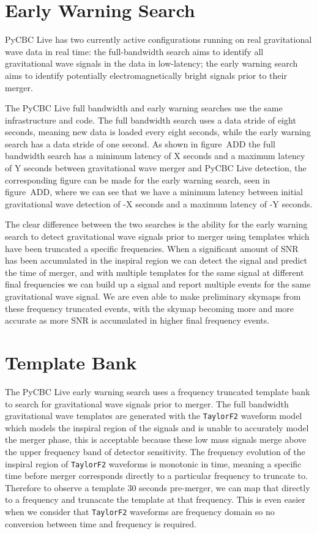 \section{Early Warning Search}

PyCBC Live has two currently active configurations running on real gravitational wave data in real time: the full-bandwidth search aims to identify all gravitational wave signals in the data in low-latency; the early warning search aims to identify potentially electromagnetically bright signals prior to their merger.

The PyCBC Live full bandwidth and early warning searches use the same infrastructure and code. The full bandwidth search uses a data stride of eight seconds, meaning new data is loaded every eight seconds, while the early warning search has a data stride of one second. As shown in figure~ADD the full bandwidth search has a minimum latency of X seconds and a maximum latency of Y seconds between gravitational wave merger and PyCBC Live detection, the corresponding figure can be made for the early warning search, seen in figure~ADD, where we can see that we have a minimum latency between initial gravitational wave detection of -X seconds and a maximum latency of -Y seconds.

The clear difference between the two searches is the ability for the early warning search to detect gravitational wave signals prior to merger using templates which have been truncated a specific frequencies. When a significant amount of SNR has been accumulated in the inspiral region we can detect the signal and predict the time of merger, and with multiple templates for the same signal at different final frequencies we can build up a signal and report multiple events for the same gravitational wave signal. We are even able to make preliminary skymaps from these frequency truncated events, with the skymap becoming more and more accurate as more SNR is accumulated in higher final frequency events.

\section{Template Bank}

The PyCBC Live early warning search uses a frequency truncated template bank to search for gravitational wave signals prior to merger. The full bandwidth gravitational wave templates are generated with the \verb|TaylorF2| waveform model which models the inspiral region of the signals and is unable to accurately model the merger phase, this is acceptable because these low mass signals merge above the upper frequency band of detector sensitivity. The frequency evolution of the inspiral region of \verb|TaylorF2| waveforms is monotonic in time, meaning a specific time before merger corresponds directly to a particular frequency to truncate to. Therefore to observe a template $30$ seconds pre-merger, we can map that directly to a frequency and trunacate the template at that frequency. This is even easier when we consider that \verb|TaylorF2| waveforms are frequency domain so no conversion between time and frequency is required.

